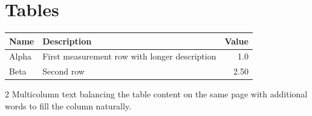 \documentclass{article}
\begin{document}
\section{Tables}
\begin{tabularx}{\textwidth}{lXr}
\toprule
\rowcolor{gray!20} Name & Description & Value \\
\midrule
Alpha & First measurement row with longer description & 1.0 \\
Beta & Second row & 2.50 \\
\bottomrule
\end{tabularx}
\begin{multicols}{2}
Multicolumn text balancing the table content on the same page
with additional words to fill the column naturally.
\end{multicols}
\end{document}
